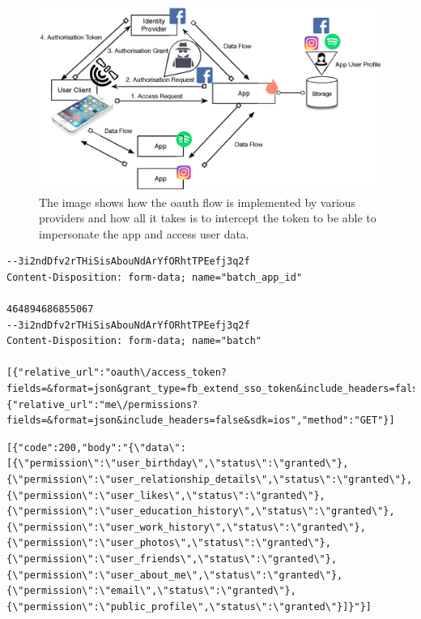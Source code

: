 \begin{figure}
\includegraphics[width=\textwidth]{figures/oauth-weak-points.eps}
\caption[OAuth 2.0 pain points.]{The image shows how the oauth flow is implemented by various providers and how all it takes is to intercept the token to be able to impersonate the app and access user data.
\label{fig:oauth-weak}}
\end{figure}

\begin{lstlisting}
--3i2ndDfv2rTHiSisAbouNdArYfORhtTPEefj3q2f
Content-Disposition: form-data; name="batch_app_id"

464894686855067
--3i2ndDfv2rTHiSisAbouNdArYfORhtTPEefj3q2f
Content-Disposition: form-data; name="batch"

[{"relative_url":"oauth\/access_token?fields=&format=json&grant_type=fb_extend_sso_token&include_headers=false&sdk=ios","method":"GET"},{"relative_url":"me\/permissions?fields=&format=json&include_headers=false&sdk=ios","method":"GET"}]
\end{lstlisting}

\begin{lstlisting}
[{"code":200,"body":"{\"data\":[{\"permission\":\"user_birthday\",\"status\":\"granted\"},{\"permission\":\"user_relationship_details\",\"status\":\"granted\"},{\"permission\":\"user_likes\",\"status\":\"granted\"},{\"permission\":\"user_education_history\",\"status\":\"granted\"},{\"permission\":\"user_work_history\",\"status\":\"granted\"},{\"permission\":\"user_photos\",\"status\":\"granted\"},{\"permission\":\"user_friends\",\"status\":\"granted\"},{\"permission\":\"user_about_me\",\"status\":\"granted\"},{\"permission\":\"email\",\"status\":\"granted\"},{\"permission\":\"public_profile\",\"status\":\"granted\"}]}"}]
\end{lstlisting}

